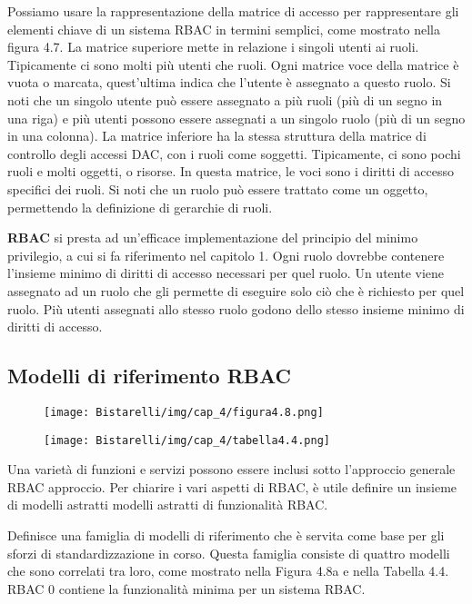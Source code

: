 Possiamo usare la rappresentazione della matrice di accesso per rappresentare gli elementi chiave di un sistema RBAC in termini semplici, come mostrato nella figura 4.7. La matrice superiore mette in relazione i singoli utenti ai ruoli. Tipicamente ci sono molti più utenti che ruoli. Ogni matrice voce della matrice è vuota o marcata, quest'ultima indica che l'utente è assegnato a questo ruolo. Si noti che un singolo utente può essere assegnato a più ruoli (più di un segno in una riga) e più utenti possono essere assegnati a un singolo ruolo (più di un segno in una colonna). La matrice inferiore ha la stessa struttura della matrice di controllo degli accessi DAC, con i ruoli come soggetti. Tipicamente, ci sono pochi ruoli e molti oggetti, o risorse. In questa matrice, le voci sono i diritti di accesso specifici dei ruoli. Si noti che un ruolo può essere trattato come un oggetto, permettendo la definizione di gerarchie di ruoli.

\singlespacing

\textbf{RBAC} si presta ad un'efficace implementazione del principio del minimo privilegio, a cui si fa riferimento nel capitolo 1. Ogni ruolo dovrebbe contenere l'insieme minimo di diritti di accesso necessari per quel ruolo. Un utente viene assegnato ad un ruolo che gli permette di eseguire solo ciò che è richiesto per quel ruolo. Più utenti assegnati allo stesso ruolo godono dello stesso insieme minimo di diritti di accesso.
\newpage
\subsection{Modelli di riferimento RBAC}

\begin{figure}[H]
	\centering
    \texttt{[image: Bistarelli/img/cap\_4/figura4.8.png]}
\end{figure}

\begin{figure}[H]
	\centering
    \texttt{[image: Bistarelli/img/cap\_4/tabella4.4.png]}
\end{figure}

Una varietà di funzioni e servizi possono essere inclusi sotto l'approccio generale RBAC approccio. Per chiarire i vari aspetti di RBAC, è utile definire un insieme di modelli astratti modelli astratti di funzionalità RBAC.

\singlespacing

Definisce una famiglia di modelli di riferimento che è servita come base per gli sforzi di standardizzazione in corso. Questa famiglia consiste di quattro modelli che sono correlati tra loro, come mostrato nella Figura 4.8a e nella Tabella 4.4. RBAC 0 contiene la funzionalità minima per un sistema RBAC.

